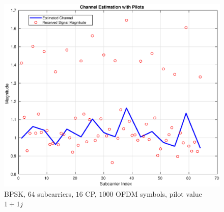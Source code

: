 \begin{figure}[!htbp]
    \centering
    \includegraphics[width=\linewidth]{Pilot.eps}
    \caption{BPSK, $64$ subcarriers, $16$ CP, $1000$ OFDM symbols, pilot value $1+1j$}
    \label{fig:pilot}
\end{figure}